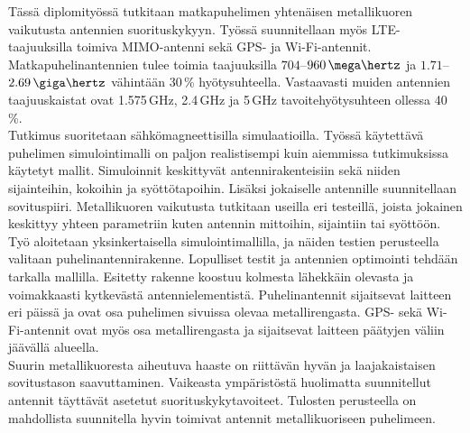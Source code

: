 Tässä diplomityössä tutkitaan matkapuhelimen yhtenäisen metallikuoren vaikutusta antennien suorituskykyyn. Työssä suunnitellaan myös LTE-taajuuksilla toimiva MIMO-antenni sekä GPS- ja Wi-Fi-antennit. Matkapuhelinantennien tulee toimia taajuuksilla $704$--$960\,\mega\hertz$ ja $1.71$--$2.69\,\giga\hertz$ vähintään 30\,\% hyötysuhteella. Vastaavasti muiden antennien taajuuskaistat ovat 1.575\,GHz, 2.4\,GHz ja 5\,GHz tavoitehyötysuhteen ollessa 40\,\%. \\

Tutkimus suoritetaan sähkömagneettisilla simulaatioilla. Työssä käytettävä puhelimen simulointimalli on paljon realistisempi kuin aiemmissa tutkimuksissa käytetyt mallit. Simuloinnit keskittyvät antennirakenteisiin sekä niiden sijainteihin, kokoihin ja syöttötapoihin. Lisäksi jokaiselle antennille suunnitellaan sovituspiiri. Metallikuoren vaikutusta tutkitaan useilla eri testeillä, joista jokainen keskittyy yhteen parametriin kuten antennin mittoihin, sijaintiin tai syöttöön. \\

Työ aloitetaan yksinkertaisella simulointimallilla, ja näiden testien perusteella valitaan puhelinantennirakenne. Lopulliset testit ja antennien optimointi tehdään tarkalla mallilla. Esitetty rakenne koostuu kolmesta lähekkäin olevasta ja voi\-mak\-kaas\-ti kytkevästä antennielementistä. Puhelinantennit sijaitsevat laitteen eri päissä ja ovat osa puhelimen sivuissa olevaa metallirengasta. GPS- sekä Wi-Fi-antennit ovat myös osa metallirengasta ja sijaitsevat laitteen päätyjen väliin jäävällä alueella. \\

Suurin me\-tal\-li\-kuo\-res\-ta aiheutuva haaste on riittävän hyvän ja laajakaistaisen sovitustason saavuttaminen. Vaikeasta ympäristöstä huolimatta suun\-ni\-tel\-lut antennit täyttävät asetetut suorituskykytavoiteet. Tulosten perusteella on mahdollista suun\-ni\-tel\-la hyvin toimivat antennit metallikuoriseen puhelimeen.
